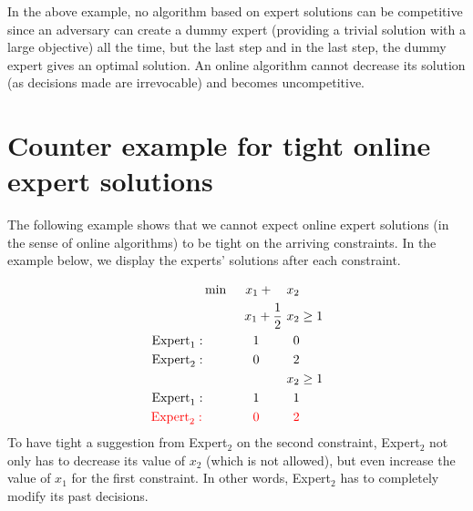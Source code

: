 In the above example, no algorithm based on expert solutions can be competitive 
since an adversary can create a dummy expert (providing a trivial solution with a large objective) all the time, but the last step 
and in the last step, the dummy expert gives an optimal solution. An online algorithm cannot decrease its solution (as decisions made are irrevocable)
and becomes uncompetitive. 

\section{Counter example for tight online expert solutions} \label{appix-tight-solutions}

The following example shows that we cannot expect online expert solutions (in the sense of online algorithms)
to be tight on the arriving constraints. In the example below, we display the experts' solutions after each constraint.

\begin{align*}
    \min\ \ \ \ x_{1} + \ \ \ x_{2} & \\
    x_{1} + \frac{1}{2}\ x_{2} & \ge 1 \\
    \textnormal{Expert}_{1}: \ \ \ \ \ \ \ \ \ \ \ 1 \ \ \ \ \ \ \ \ 0 & \\
    \textnormal{Expert}_{2}: \ \ \ \ \ \ \ \ \ \ \ 0 \ \ \ \ \ \ \ \ 2 & \\
    x_{2} & \ge 1 \\
    \textnormal{Expert}_{1}: \ \ \ \ \ \ \ \ \ \ \ 1 \ \ \ \ \ \ \ \ 1 & \\
    {\color{red}\textnormal{Expert}_{2}:} \ \ \ \ \ \ \ \ \ \ \ \ {\color{red} 0} \ \ \ \ \ \ \ \ {\color{red} 2} & \\
\end{align*}
%
To have tight a suggestion from Expert$_2$ on the second constraint, Expert$_2$ not only has to decrease its value of $x_{2}$ (which is not allowed), but even increase the value of $x_{1}$ for the first constraint. In other words, Expert$_2$ has to completely modify its past decisions.
